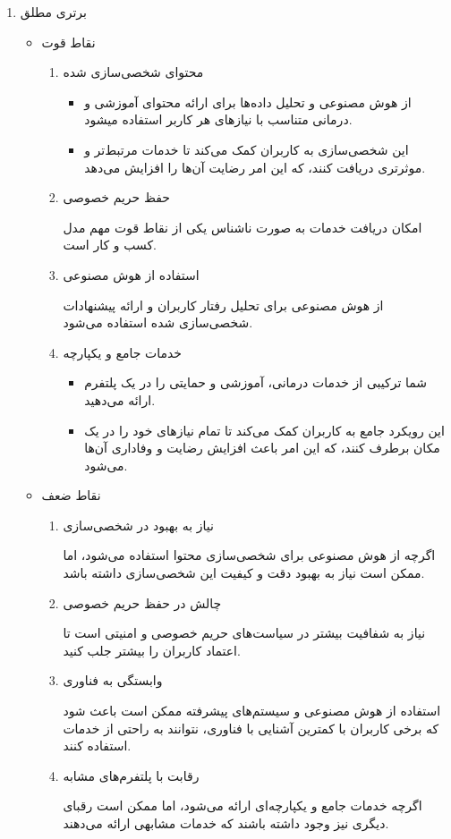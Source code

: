 \documentclass[dvipsnames, svgnames, x11names, 11pt]{article}
\begin{document}
\begin{enumerate}
\item 
برتری مطلق
\begin{itemize}
\item 
نقاط قوت
\begin{enumerate}
\item 
محتوای شخصی‌سازی شده
\begin{itemize}
\item 
از هوش مصنوعی و تحلیل داده‌ها برای ارائه محتوای آموزشی و درمانی متناسب با نیازهای هر کاربر استفاده میشود.
\item 
این شخصی‌سازی به کاربران کمک می‌کند تا خدمات مرتبط‌تر و موثرتری دریافت کنند، که این امر رضایت آن‌ها را افزایش می‌دهد.
\end{itemize}

\item 
حفظ حریم خصوصی

امکان دریافت خدمات به صورت ناشناس یکی از نقاط قوت مهم مدل کسب و کار است.

\item 
استفاده از هوش مصنوعی

از هوش مصنوعی برای تحلیل رفتار کاربران و ارائه پیشنهادات شخصی‌سازی شده استفاده می‌شود.

\item 
خدمات جامع و یکپارچه

\begin{itemize}
\item 
شما ترکیبی از خدمات درمانی، آموزشی و حمایتی را در یک پلتفرم ارائه می‌دهید.
\item 
این رویکرد جامع به کاربران کمک می‌کند تا تمام نیازهای خود را در یک مکان برطرف کنند، که این امر باعث افزایش رضایت و وفاداری آن‌ها می‌شود.
\end{itemize}
\end{enumerate}

\item 
نقاط ضعف
\begin{enumerate}
\item 
نیاز به بهبود در شخصی‌سازی

اگرچه از هوش مصنوعی برای شخصی‌سازی محتوا استفاده می‌شود، اما ممکن است نیاز به بهبود دقت و کیفیت این شخصی‌سازی داشته باشد.

\item 
چالش در حفظ حریم خصوصی

نیاز به شفافیت بیشتر در سیاست‌های حریم خصوصی و امنیتی است تا اعتماد کاربران را بیشتر جلب کنید.

\item 
وابستگی به فناوری

استفاده از هوش مصنوعی و سیستم‌های پیشرفته ممکن است باعث شود که برخی کاربران با کمترین آشنایی با فناوری، نتوانند به راحتی از خدمات استفاده کنند.

\item 
رقابت با پلتفرم‌های مشابه

اگرچه خدمات جامع و یکپارچه‌ای ارائه می‌شود، اما ممکن است رقبای دیگری نیز وجود داشته باشند که خدمات مشابهی ارائه می‌دهند.
\end{enumerate}
\end{itemize}
\end{enumerate}
\end{document}
